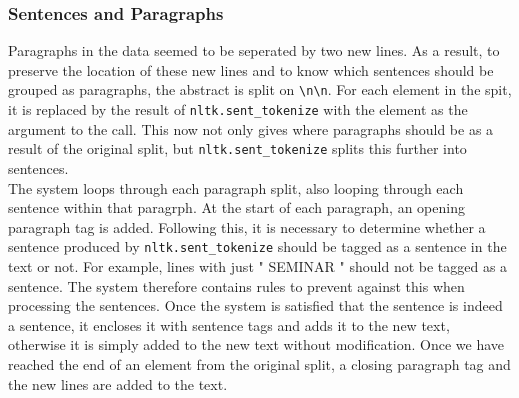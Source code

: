 \documentclass[10pt]{article}
\begin{document}
\begin{multicols}{2}
\subsubsection{Sentences and Paragraphs}
Paragraphs in the data seemed to be seperated by two new lines. As a result, to preserve the location of these new lines and to know which sentences should be grouped as paragraphs, the abstract is split on {{\tt \textbackslash n\textbackslash n}}. For each element in the spit, it is replaced by the result of {{\tt nltk.sent\_tokenize}} with the element as the argument to the call. This now not only gives where paragraphs should be as a result of the original split, but {{\tt nltk.sent\_tokenize}} splits this further into sentences.\\
The system loops through each paragraph split, also looping through each sentence within that paragrph. At the start of each paragraph, an opening paragraph tag is added. Following this, it is necessary to determine whether a sentence produced by {{\tt nltk.sent\_tokenize}} should be tagged as a sentence in the text or not. For example, lines with just "	SEMINAR    " should not be tagged as a sentence. The system therefore contains rules to prevent against this when processing the sentences. Once the system is satisfied that the sentence is indeed a sentence, it encloses it with sentence tags and adds it to the new text, otherwise it is simply added to the new text without modification. Once we have reached the end of an element from the original split, a closing paragraph tag and the new lines are added to the text.

\end{multicols}
\end{document}
